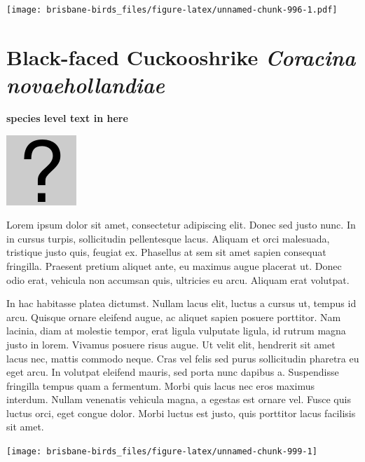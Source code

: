\documentclass[]{book}
\let\origfigure\figure
\let\endorigfigure\endfigure
\renewenvironment{figure}[1][2] {
  \expandafter\origfigure\expandafter[H]
} {
  \endorigfigure
}
\begin{document}
\begin{figure}
\centering
\texttt{[image: brisbane-birds\_files/figure-latex/unnamed-chunk-996-1.pdf]}
\caption{\label{fig:unnamed-chunk-996}insert figure caption}
\end{figure}

\section{\texorpdfstring{Black-faced Cuckooshrike \emph{Coracina
novaehollandiae}}{Black-faced Cuckooshrike Coracina novaehollandiae}}\label{black-faced-cuckooshrike-coracina-novaehollandiae}

\textbf{species level text in here}

\begin{figure}
\centering
\includegraphics{assets/missing.png}
\caption{No image for species}
\end{figure}

Lorem ipsum dolor sit amet, consectetur adipiscing elit. Donec sed justo
nunc. In in cursus turpis, sollicitudin pellentesque lacus. Aliquam et
orci malesuada, tristique justo quis, feugiat ex. Phasellus at sem sit
amet sapien consequat fringilla. Praesent pretium aliquet ante, eu
maximus augue placerat ut. Donec odio erat, vehicula non accumsan quis,
ultricies eu arcu. Aliquam erat volutpat.

In hac habitasse platea dictumst. Nullam lacus elit, luctus a cursus ut,
tempus id arcu. Quisque ornare eleifend augue, ac aliquet sapien posuere
porttitor. Nam lacinia, diam at molestie tempor, erat ligula vulputate
ligula, id rutrum magna justo in lorem. Vivamus posuere risus augue. Ut
velit elit, hendrerit sit amet lacus nec, mattis commodo neque. Cras vel
felis sed purus sollicitudin pharetra eu eget arcu. In volutpat eleifend
mauris, sed porta nunc dapibus a. Suspendisse fringilla tempus quam a
fermentum. Morbi quis lacus nec eros maximus interdum. Nullam venenatis
vehicula magna, a egestas est ornare vel. Fusce quis luctus orci, eget
congue dolor. Morbi luctus est justo, quis porttitor lacus facilisis sit
amet.

\begin{figure}
\texttt{[image: brisbane-birds\_files/figure-latex/unnamed-chunk-999-1]} \caption{insert figure caption}\label{fig:unnamed-chunk-999}
\end{figure}
\end{document}
